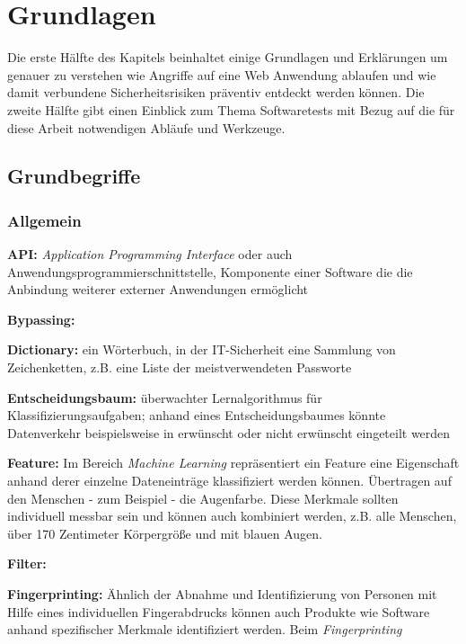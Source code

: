 \chapter{Grundlagen}



Die erste Hälfte des Kapitels beinhaltet einige Grundlagen und Erklärungen um genauer zu verstehen wie Angriffe auf eine Web Anwendung ablaufen und wie damit verbundene Sicherheitsrisiken präventiv entdeckt werden können. Die zweite Hälfte gibt einen Einblick zum Thema Softwaretests mit Bezug auf die für diese Arbeit notwendigen Abläufe und Werkzeuge. 

\section{Grundbegriffe}

\subsection{Allgemein}

\textbf{API:} \emph{Application Programming Interface} oder auch Anwendungsprogrammierschnittstelle, Komponente einer Software die die Anbindung weiterer externer Anwendungen ermöglicht

\textbf{Bypassing:}

\textbf{Dictionary:} ein Wörterbuch, in der IT-Sicherheit eine Sammlung von Zeichenketten, z.B. eine Liste der meistverwendeten Passworte

\textbf{Entscheidungsbaum:} überwachter Lernalgorithmus für Klassifizierungsaufgaben; anhand eines Entscheidungsbaumes könnte Datenverkehr beispielsweise in erwünscht oder nicht erwünscht eingeteilt werden

\textbf{Feature:} Im Bereich \emph{Machine Learning} repräsentiert ein Feature eine Eigenschaft anhand derer einzelne Dateneinträge klassifiziert werden können. Übertragen auf den Menschen - zum Beispiel - die Augenfarbe. Diese Merkmale sollten individuell messbar sein und können auch kombiniert werden, z.B. alle Menschen, über 170 Zentimeter Körpergröße und mit blauen Augen. 

\textbf{Filter:}

\textbf{Fingerprinting:} Ähnlich der Abnahme und Identifizierung von Personen mit Hilfe eines individuellen Fingerabdrucks können auch Produkte wie Software anhand spezifischer Merkmale identifiziert werden. Beim \emph{Fingerprinting}

